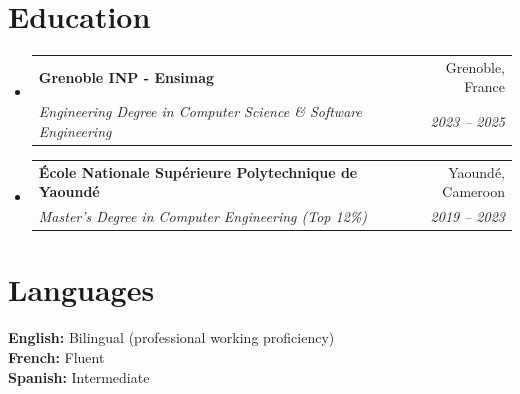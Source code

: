 \documentclass[letterpaper,11pt]{article}
\makeatletter
\newcommand{\resumeSubheading}[4]{
  \vspace{-2pt}\item
    \begin{tabular*}{0.97\textwidth}[t]{l@{\extracolsep{\fill}}r}
      \textbf{#1} & #2 \\
      \textit{\small#3} & \textit{\small #4} \\
    \end{tabular*}\vspace{-7pt}
}
\newcommand{\resumeSubHeadingListStart}{\begin{itemize}[leftmargin=0.15in, label={}]}
\newcommand{\resumeSubHeadingListEnd}{\end{itemize}}
\makeatother
\begin{document}
\section{Education}

\resumeSubHeadingListStart
  \resumeSubheading
    {Grenoble INP - Ensimag}{Grenoble, France}
    {Engineering Degree in Computer Science \& Software Engineering}{2023 -- 2025}
  \resumeSubheading
    {\'Ecole Nationale Sup\'erieure Polytechnique de Yaound\'e}{Yaound\'e, Cameroon}
    {Master's Degree in Computer Engineering (Top 12\%)}{2019 -- 2023}
\resumeSubHeadingListEnd

\section{Languages}

\small{
\textbf{English:} Bilingual (professional working proficiency) \\
\textbf{French:} Fluent \\
\textbf{Spanish:} Intermediate
}
\end{document}
